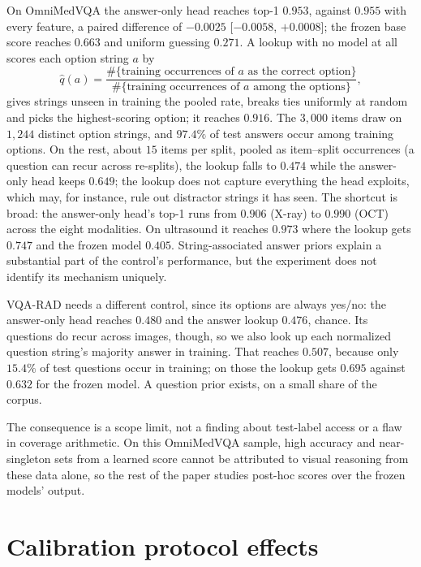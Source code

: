\documentclass[a4paper,conference]{IEEEtran}
\newcommand{\rtag}[1]{}
\begin{document}
On OmniMedVQA the answer-only head reaches top-1 $0.953$, against $0.955$ with
every feature, a paired difference of $-0.0025$ [$-0.0058$, $+0.0008$];\rtag{R2.3} the
frozen base
score reaches $0.663$ and uniform guessing $0.271$. A lookup with no model at
all scores each option string $a$ by
\begin{equation*}
\hat q(a)=\frac{\#\{\text{training occurrences of }a\text{ as the correct option}\}}
{\#\{\text{training occurrences of }a\text{ among the options}\}},
\end{equation*}
gives strings unseen in training the pooled rate, breaks ties uniformly at
random and picks the highest-scoring option; it reaches $0.916$. The $3{,}000$
items draw on $1{,}244$ distinct option strings, and $97.4\%$ of test answers
occur among training options. On the rest, about $15$ items per split, pooled
as item--split occurrences (a question can recur across re-splits), the lookup
falls to $0.474$ while the answer-only head keeps $0.649$; the lookup does not
capture everything the head exploits, which may, for instance, rule out
distractor strings it has seen. The shortcut is broad: the answer-only head's
top-1 runs from $0.906$ (X-ray) to $0.990$ (OCT) across the eight modalities.
On ultrasound it reaches $0.973$ where the lookup gets $0.747$ and the frozen
model $0.405$. String-associated
answer priors explain a substantial part of the control's performance, but the
experiment does not identify its mechanism uniquely.\rtag{R2.3}

VQA-RAD needs a different control, since its options are always yes/no: the
answer-only head reaches $0.480$ and the answer lookup $0.476$, chance. Its
questions do recur across images, though, so we also look up each normalized
question string's majority answer in training. That reaches $0.507$, because
only $15.4\%$ of test questions occur in training; on those the lookup gets
$0.695$ against $0.632$ for the frozen model. A question prior exists, on a
small share of the corpus.\rtag{R1.6}

The consequence is a scope limit, not a finding about test-label access or a
flaw in coverage arithmetic. On this OmniMedVQA sample, high accuracy and
near-singleton sets from a learned score cannot be attributed to visual
reasoning from these data alone, so the rest of the paper studies post-hoc
scores over the frozen models' output.\rtag{R1.W}

\section{Calibration protocol effects}\label{sec:protocol}
\end{document}
